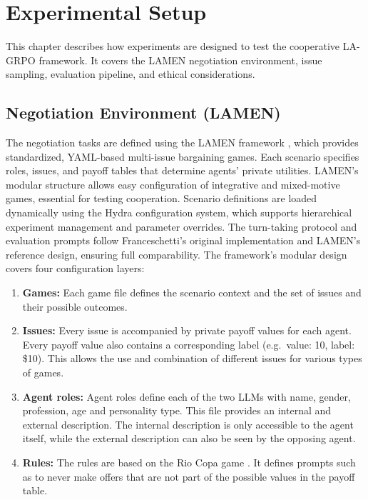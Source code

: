 \documentclass[12pt,a4paper]{article}
\begin{document}
\newpage
\section{Experimental Setup}
\label{sec:experimental_setup}

This chapter describes how experiments are designed to test the cooperative LA-GRPO framework. It covers the LAMEN negotiation environment, issue sampling, evaluation pipeline, and ethical considerations.

\subsection{Negotiation Environment (LAMEN)}

The negotiation tasks are defined using the LAMEN framework \citep{davidson2024evaluatinglanguagemodelagency}, which provides standardized, YAML-based multi-issue bargaining games. Each scenario specifies roles, issues, and payoff tables that determine agents' private utilities. LAMEN's modular structure allows easy configuration of integrative and mixed-motive games, essential for testing cooperation. Scenario definitions are loaded dynamically using the Hydra configuration system, which supports hierarchical experiment management and parameter overrides. The turn-taking protocol and evaluation prompts follow Franceschetti's original implementation and LAMEN's reference design, ensuring full comparability. The framework's modular design covers four configuration layers:

\begin{enumerate}[label={}, leftmargin=0pt]
    \item \textbf{Games:} Each game file defines the scenario context and the set of issues and their possible outcomes.
    \item \textbf{Issues:} Every issue is accompanied by private payoff values for each agent. Every payoff value also contains a corresponding label (e.g.\ value: 10, label: \$10). This allows the use and combination of different issues for various types of games.
    \item \textbf{Agent roles:} Agent roles define each of the two LLMs with name, gender, profession, age and personality type. This file provides an internal and external description. The internal description is only accessible to the agent itself, while the external description can also be seen by the opposing agent.
    \item \textbf{Rules:} The rules are based on the Rio Copa game \citep{bontempo2008riocopa}. It defines prompts such as to never make offers that are not part of the possible values in the payoff table.
\end{enumerate}
\end{document}
